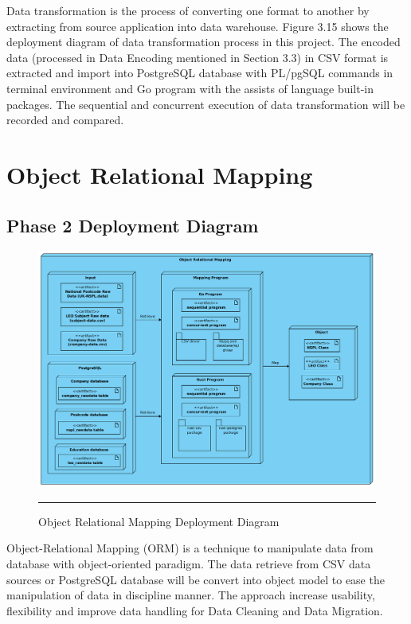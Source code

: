 Data transformation is the process of converting one format to another by extracting from source application into data warehouse. \cite{data-transformation-definition} Figure 3.15 shows the deployment diagram of data transformation process in this project. The encoded data (processed in Data Encoding mentioned in Section 3.3) in CSV format is extracted and import into PostgreSQL database with PL/pgSQL commands in terminal environment and Go program with the assists of language built-in packages. The sequential and concurrent execution of data transformation will be recorded and compared. 

\section{Object Relational Mapping}

\subsection{Phase 2 Deployment Diagram}

\begin{figure}[H]
	\centering
	\includegraphics[width=1.0\textwidth]{FYP2/Chapter3/FYP2-ORM-deployment.png}
	\rule{35em}{0.5pt}
	\caption[Object Relational Mapping Deployment Diagram]{Object Relational Mapping Deployment Diagram}
\end{figure} 

Object-Relational Mapping (ORM) is a technique to manipulate data from database with object-oriented paradigm. The data retrieve from CSV data sources or PostgreSQL database will be convert into object model to ease the manipulation of data in discipline manner. \cite{orm-introduction} The approach increase usability, flexibility and improve data handling for Data Cleaning and Data Migration.

